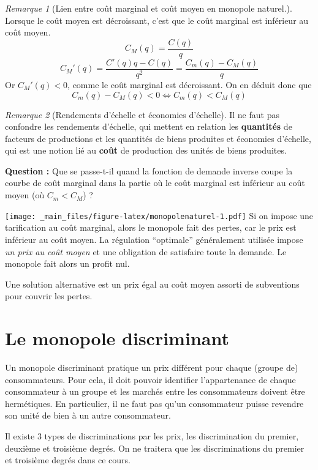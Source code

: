 \documentclass[
]{book}
\theoremstyle{definition}
\theoremstyle{definition}
\theoremstyle{definition}
\theoremstyle{definition}
\theoremstyle{remark}
\newtheorem*{remark}{Remarque}
\begin{document}
\begin{remark}[Lien entre coût marginal et coût moyen en monopole naturel.]
Lorsque le coût moyen est décroissant, c'est que le coût marginal est inférieur au coût moyen.
\[
C_M(q) = \frac{C(q)}{q}
\]
\[
C_M'(q) =\frac{C'(q)q-C(q)}{q^2} = \frac{C_m(q)-C_M(q)}{q}
\]
Or \(C_M'(q)<0\), comme le coût marginal est décroissant.
On en déduit donc que
\[
C_m(q)-C_M(q)< 0 \Leftrightarrow C_m(q)<C_M(q)
\]
\end{remark}

\begin{remark}[Rendements d'échelle et économies d'échelle]
Il ne faut pas confondre les rendements d'échelle, qui mettent en relation les \textbf{quantités} de facteurs de productions et les quantités de biens produites et économies d'échelle, qui est une notion lié au \textbf{coût} de production des unités de biens produites.
\end{remark}

\textbf{Question :} Que se passe-t-il quand la fonction de demande inverse coupe la courbe de coût marginal dans la partie où le coût marginal est inférieur au coût moyen (où \(C_m<C_M\)) ?

\texttt{[image: \_main\_files/figure-latex/monopolenaturel-1.pdf]}
Si on impose une tarification au coût marginal, alors le monopole fait des pertes, car le prix est inférieur au coût moyen.
La régulation ``optimale'' généralement utilisée impose \emph{un prix au coût moyen} et une obligation de satisfaire toute la demande.
Le monopole fait alors un profit nul.

Une solution alternative est un prix égal au coût moyen assorti de subventions pour couvrir les pertes.

\hypertarget{le-monopole-discriminant}{%
\section{Le monopole discriminant}\label{le-monopole-discriminant}}

Un monopole discriminant pratique un prix différent pour chaque (groupe de) consommateurs.
Pour cela, il doit pouvoir identifier l'appartenance de chaque consommateur à un groupe et les marchés entre les consommateurs doivent être hermétiques.
En particulier, il ne faut pas qu'un consommateur puisse revendre son unité de bien à un autre consommateur.

Il existe 3 types de discriminations par les prix, les discrimination du premier, deuxième et troisième degrés.
On ne traitera que les discriminations du premier et troisième degrés dans ce cours.
\end{document}

